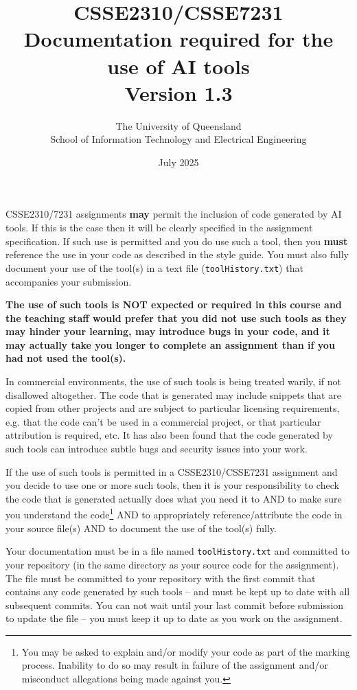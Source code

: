 \documentclass{article}
\title{CSSE2310/CSSE7231\\Documentation required for the use of AI tools\\Version 1.3}
\author{The University of Queensland\\School of Information Technology and Electrical Engineering}
\date{July 2025}
\begin{document}
\maketitle
\thispagestyle{plain}
\linenumbers

CSSE2310/7231 assignments \textbf{may} permit the inclusion of code generated by AI tools. If this is the case
then it will be clearly specified in the assignment specification. If such use is permitted and you do use such a tool, 
then you \textbf{must} reference the use in your code as described in the style guide. You must also fully document your use 
of the tool(s) in a text file (\texttt{toolHistory.txt}) that accompanies your submission.

\textbf{The use of such tools is NOT expected or required in this course and the teaching staff would prefer that you did
not use such tools as they may hinder your learning, may introduce bugs in your code, and it may actually take
you longer to complete an assignment than if you had not used the tool(s).}

In commercial environments, the use of such tools is being treated warily, if not disallowed altogether. The code that 
is generated may include snippets that are copied from other projects and are subject to particular licensing requirements, 
e.g. that the code can't be used in a commercial project, or that particular attribution is required, etc. It has also been found 
that the code generated by such tools can introduce subtle bugs and security issues into your work. 

If the use of such tools is permitted in a CSSE2310/CSSE7231 assignment and you decide to use one or more such tools, then it is your responsibility
to check the code that is generated actually does what you need it to AND to make sure you understand the code\footnote{You may be asked to explain and/or 
modify your code as part of the marking process. Inability to do so may result in failure of the assignment and/or misconduct 
allegations being made against you.} AND to appropriately reference/attribute the code in your source file(s) 
AND to document the use of the tool(s) fully.

Your documentation must be in a file named \texttt{toolHistory.txt} and committed to your repository (in the same directory as your 
source code for the assignment). The file must be committed to your repository with the first commit that contains any code generated
by such tools -- and must be kept up to date with all subsequent commits. You can not wait until your last commit before submission
to update the file -- you must keep it up to date as you work on the assignment.
\end{document}
